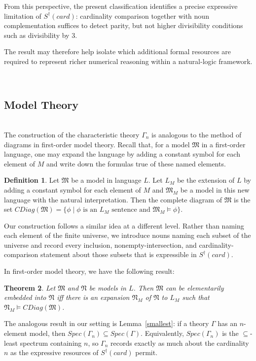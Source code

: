 \documentclass[12pt, reqno]{amsart}
\newtheorem{theorem}{Theorem}[section]
\theoremstyle{definition}
\newtheorem{definition}[theorem]{Definition}
\theoremstyle{remark}
\numberwithin{equation}{section}
\begin{document}
From this perspective, the present classification identifies a precise expressive limitation of $S^\dagger(card)$: cardinality comparison together with noun complementation suffices to detect parity,
but not higher divisibility conditions such as divisibility by $3$.

The result may therefore help isolate which additional formal resources are required to represent richer numerical reasoning within a natural-logic framework. 

\hfill \\ 
\subsection{Model Theory} \hfill \\ 
The construction of the characteristic theory $\Gamma_n$ is analogous to the method of diagrams in first-order model theory. Recall that, for
a model $\mathfrak{M}$ in a first-order language, one may expand the language by adding a constant symbol for each element of $M$ and write down the formulas true of these named elements.

\begin{definition}
	Let $\mathfrak{M}$ be a model in language $L$. Let $L_{M}$ be the extension of $L$ by adding a constant symbol for each element of $M$ and $\mathfrak{M}_M$ be a model in this new language with the natural interpretation. Then the complete diagram of $\mathfrak{M}$ is the set $CDiag(\mathfrak{M}) = \{\phi \mid \mbox{$\phi$ is an $L_{M}$ sentence and } \mathfrak{M}_{M} \models \phi\}$. 
\end{definition}
	
Our construction follows a similar idea at a different level. Rather
than naming each element of the finite universe, we introduce nouns
naming each subset of the universe and record every inclusion,
nonempty-intersection, and cardinality-comparison statement about
those subsets that is expressible in $S^\dagger(card)$.

In first-order model theory, we have the following result:

\begin{theorem}
Let $\mathfrak M$ and $\mathfrak N$ be models in $L$. Then $\mathfrak M$ can be elementarily embedded into $\mathfrak N$ iff there is an expansion $\mathfrak N_M$ of $\mathfrak N$ to $L_M$ such that $\mathfrak N_M\models CDiag(\mathfrak M)$.
\end{theorem}

The analogous result in our setting is Lemma~\ref{smallest}: if a theory $\Gamma$ has an
$n$-element model, then $Spec(\Gamma_n) \subseteq Spec(\Gamma)$. Equivalently,
$Spec(\Gamma_n)$ is the $\subseteq$-least spectrum containing $n$, so $\Gamma_n$ records
exactly as much about the cardinality $n$ as the expressive resources of $S^\dagger(card)$ permit. 
\end{document}
